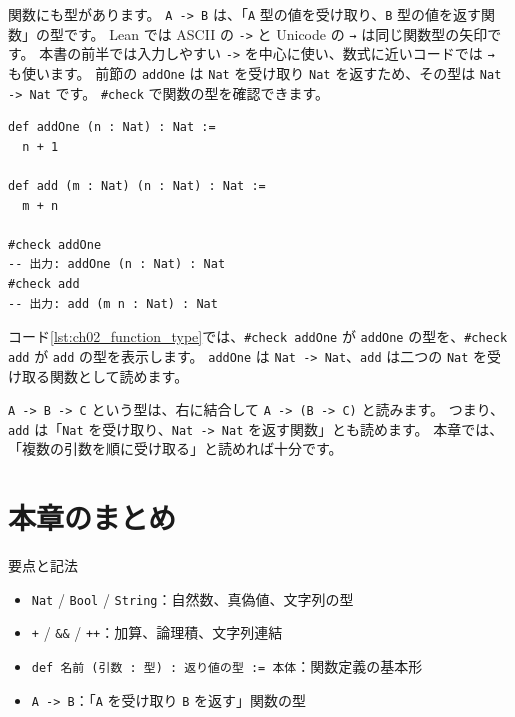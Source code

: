関数にも型があります。
\texttt{A -> B} は、「\texttt{A} 型の値を受け取り、\texttt{B} 型の値を返す関数」の型です。
Lean では ASCII の \texttt{->} と Unicode の \texttt{→} は同じ関数型の矢印です。
本書の前半では入力しやすい \texttt{->} を中心に使い、数式に近いコードでは \texttt{→} も使います。
前節の \texttt{addOne} は \texttt{Nat} を受け取り \texttt{Nat} を返すため、その型は \texttt{Nat -> Nat} です。
\texttt{\#check} で関数の型を確認できます。

\begin{listing}[htbp]
\begin{verbatim}
def addOne (n : Nat) : Nat :=
  n + 1

def add (m : Nat) (n : Nat) : Nat :=
  m + n

#check addOne
-- 出力: addOne (n : Nat) : Nat
#check add
-- 出力: add (m n : Nat) : Nat
\end{verbatim}
\caption{\texttt{addOne} と \texttt{add} の型}
\label{lst:ch02_function_type}
\end{listing}

コード\ref{lst:ch02_function_type}では、\texttt{\#check addOne} が \texttt{addOne} の型を、\texttt{\#check add} が \texttt{add} の型を表示します。
\texttt{addOne} は \texttt{Nat -> Nat}、\texttt{add} は二つの \texttt{Nat} を受け取る関数として読めます。

\texttt{A -> B -> C} という型は、右に結合して \texttt{A -> (B -> C)} と読みます。
つまり、\texttt{add} は「\texttt{Nat} を受け取り、\texttt{Nat -> Nat} を返す関数」とも読めます。
本章では、「複数の引数を順に受け取る」と読めれば十分です。

\section{本章のまとめ}

要点と記法
\begin{itemize}
\item \texttt{Nat} / \texttt{Bool} / \texttt{String}：自然数、真偽値、文字列の型
\item \texttt{+} / \texttt{\&\&} / \texttt{++}：加算、論理積、文字列連結
\item \texttt{def 名前 (引数 : 型) : 返り値の型 := 本体}：関数定義の基本形
\item \texttt{A -> B}：「\texttt{A} を受け取り \texttt{B} を返す」関数の型
\end{itemize}
